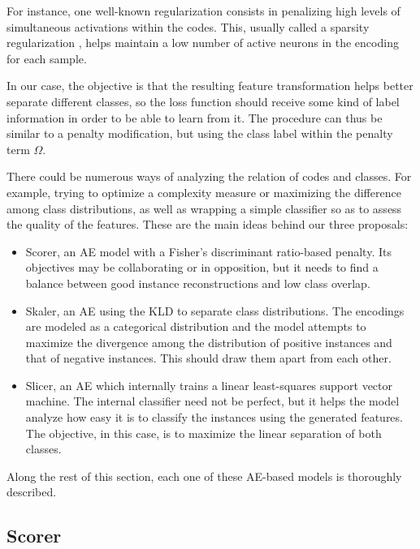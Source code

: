 For instance, one well-known regularization consists in penalizing high levels of simultaneous activations within the codes. This, usually called a sparsity regularization , helps maintain a low number of active neurons in the encoding for each sample.

In our case, the objective is that the resulting feature transformation helps better separate different classes, so the loss function should receive some kind of label information in order to be able to learn from it. The procedure can thus be similar to a penalty modification, but using the class label within the penalty term $\Omega$.

There could be numerous ways of analyzing the relation of codes and classes. For example, trying to optimize a complexity measure or maximizing the difference among class distributions, as well as wrapping a simple classifier so as to assess the quality of the features. These are the main ideas behind our three proposals:
\begin{itemize}
  \item Scorer, an AE model with a Fisher's discriminant ratio-based penalty. Its objectives may be collaborating or in opposition, but it needs to find a balance between good instance reconstructions and low class overlap.
  \item Skaler, an AE using the KLD to separate class distributions. The encodings are modeled as a categorical distribution and the model attempts to maximize the divergence among the distribution of positive instances and that of negative instances. This should draw them apart from each other.
  \item Slicer, an AE which internally trains a linear least-squares support vector machine. The internal classifier need not be perfect, but it helps the model analyze how easy it is to classify the instances using the generated features. The objective, in this case, is to maximize the linear separation of both classes.
\end{itemize}
Along the rest of this section, each one of these AE-based models is thoroughly described.



\subsection{Scorer}


